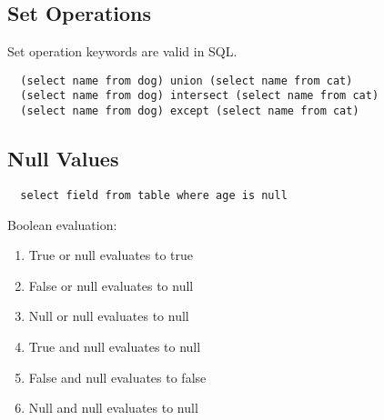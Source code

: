 \documentclass{math}
\begin{document}
\subsection*{Set Operations}
Set operation keywords are valid in SQL.
\begin{lstlisting}
  (select name from dog) union (select name from cat)
  (select name from dog) intersect (select name from cat)
  (select name from dog) except (select name from cat)
\end{lstlisting}

\subsection*{Null Values}
\begin{lstlisting}
  select field from table where age is null
\end{lstlisting}
Boolean evaluation:
\begin{enumerate}
  \item True or null evaluates to true
  \item False or null evaluates to null
  \item Null or null evaluates to null
  \item True and null evaluates to null
  \item False and null evaluates to false
  \item Null and null evaluates to null
\end{enumerate}
\end{document}
